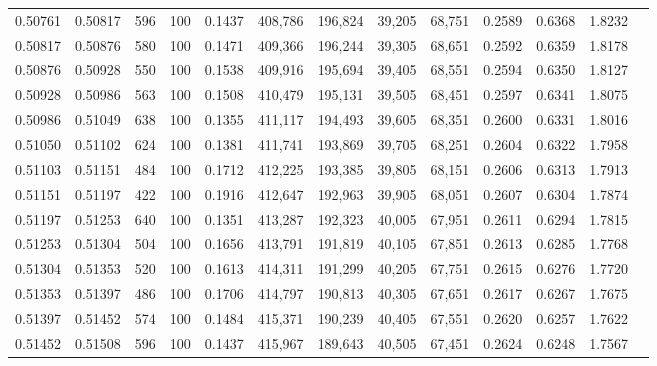\begin{tabular}{rrrrrrrrrrrrr}
0.50761 & 0.50817 &   596 & 100 &                                     0.1437 & 408,786 & 196,824 &  39,205 &  68,751 & 0.2589 & 0.6368 & 1.8232 \\
0.50817 & 0.50876 &   580 & 100 &                                     0.1471 & 409,366 & 196,244 &  39,305 &  68,651 & 0.2592 & 0.6359 & 1.8178 \\
0.50876 & 0.50928 &   550 & 100 &                                     0.1538 & 409,916 & 195,694 &  39,405 &  68,551 & 0.2594 & 0.6350 & 1.8127 \\
0.50928 & 0.50986 &   563 & 100 &                                     0.1508 & 410,479 & 195,131 &  39,505 &  68,451 & 0.2597 & 0.6341 & 1.8075 \\
0.50986 & 0.51049 &   638 & 100 &                                     0.1355 & 411,117 & 194,493 &  39,605 &  68,351 & 0.2600 & 0.6331 & 1.8016 \\
0.51050 & 0.51102 &   624 & 100 &                                     0.1381 & 411,741 & 193,869 &  39,705 &  68,251 & 0.2604 & 0.6322 & 1.7958 \\
0.51103 & 0.51151 &   484 & 100 &                                     0.1712 & 412,225 & 193,385 &  39,805 &  68,151 & 0.2606 & 0.6313 & 1.7913 \\
0.51151 & 0.51197 &   422 & 100 &                                     0.1916 & 412,647 & 192,963 &  39,905 &  68,051 & 0.2607 & 0.6304 & 1.7874 \\
0.51197 & 0.51253 &   640 & 100 &                                     0.1351 & 413,287 & 192,323 &  40,005 &  67,951 & 0.2611 & 0.6294 & 1.7815 \\
0.51253 & 0.51304 &   504 & 100 &                                     0.1656 & 413,791 & 191,819 &  40,105 &  67,851 & 0.2613 & 0.6285 & 1.7768 \\
0.51304 & 0.51353 &   520 & 100 &                                     0.1613 & 414,311 & 191,299 &  40,205 &  67,751 & 0.2615 & 0.6276 & 1.7720 \\
0.51353 & 0.51397 &   486 & 100 &                                     0.1706 & 414,797 & 190,813 &  40,305 &  67,651 & 0.2617 & 0.6267 & 1.7675 \\
0.51397 & 0.51452 &   574 & 100 &                                     0.1484 & 415,371 & 190,239 &  40,405 &  67,551 & 0.2620 & 0.6257 & 1.7622 \\
0.51452 & 0.51508 &   596 & 100 &                                     0.1437 & 415,967 & 189,643 &  40,505 &  67,451 & 0.2624 & 0.6248 & 1.7567 \\

\end{tabular}

